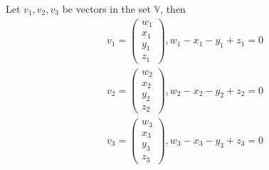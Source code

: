 \documentclass[12pt, letterpaper]{article}
\begin{document}
Let $v_1, v_2, v_3$ be vectors in the set $\mathbb{V}$, then
\begin{equation}
  \label{1a1}
  \begin{split}
    v_1 = \begin{pmatrix}w_1\\x_1\\y_1\\z_1\end{pmatrix}, w_1 - x_1 - y_1 + z_1 = 0\\
    v_2 = \begin{pmatrix}w_2\\x_2\\y_2\\z_2\end{pmatrix}, w_2 - x_2 - y_2 + z_2 = 0\\
    v_3 = \begin{pmatrix}w_3\\x_3\\y_3\\z_3\end{pmatrix}, w_3 - x_3 - y_3 + z_3 = 0
  \end{split}
\end{equation}
\end{document}

